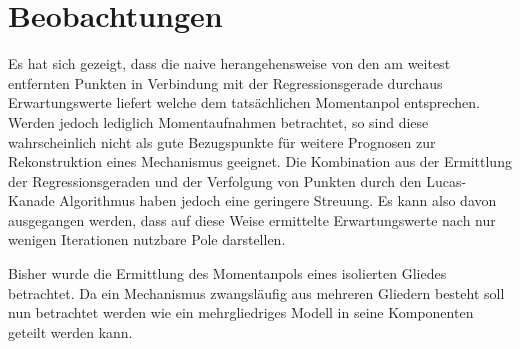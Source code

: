 
\section{Beobachtungen}
Es hat sich gezeigt, dass die naive herangehensweise von den am weitest entfernten Punkten in Verbindung mit der Regressionsgerade durchaus Erwartungswerte liefert welche dem tatsächlichen Momentanpol entsprechen.
Werden jedoch lediglich Momentaufnahmen betrachtet, so sind diese wahrscheinlich nicht als gute Bezugspunkte für weitere Prognosen zur Rekonstruktion eines Mechanismus geeignet.
Die Kombination aus der Ermittlung der Regressionsgeraden und der Verfolgung von Punkten durch den Lucas-Kanade Algorithmus haben jedoch eine geringere Streuung.
Es kann also davon ausgegangen werden, dass auf diese Weise ermittelte Erwartungswerte nach nur wenigen Iterationen nutzbare Pole darstellen.

Bisher wurde die Ermittlung des Momentanpols eines isolierten Gliedes betrachtet.
Da ein Mechanismus zwangsläufig aus mehreren Gliedern besteht soll nun betrachtet werden wie ein mehrgliedriges Modell in seine Komponenten geteilt werden kann.
